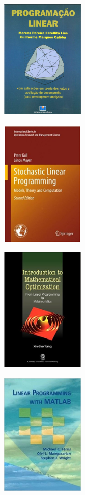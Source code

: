 \documentclass{beamer}
\begin{document}
\begin{frame}
{
	\begin{figure}[!htb]
		\includegraphics[width=4cm, height=6cm]{programacaolinearcaloba.png}
	\end{figure}
}

{
	\begin{figure}[!htb]
		\includegraphics[width=4cm, height=6cm]{sthocasticlinearprogramming.jpg}
	\end{figure}
}

{
	\begin{figure}[!htb]
		\includegraphics[width=4cm, height=6cm]{introductiontomathematicaloptmization.jpg}
	\end{figure}
}

{
	\begin{figure}[!htb]
		\includegraphics[width=4cm, height=6cm]{linearprogrammingwithmatlab.jpg}
	\end{figure}
}


\end{frame}
\end{document}
